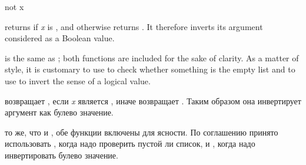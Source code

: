 \begin{defun}[Function]
not x

 returns {\true} if \emph{x} is {\false}, and otherwise returns {\false}.
It therefore inverts its argument considered as a Boolean value.

 is the same as ; both functions are included for the sake
of clarity.  As a matter of style,
it is customary to use  to check whether something is the empty list
and to use  to invert the sense of a logical value.

 возвращает {\true}, если \emph{x} является {\false}, иначе
возвращает {\false}.
Таким образом она инвертирует аргумент как булево значение.

 то же, что и , обе функции включены для ясности. По
соглашению принято использовать , когда надо проверить пустой ли
список, и , когда надо инвертировать булево значение.
\end{defun}

